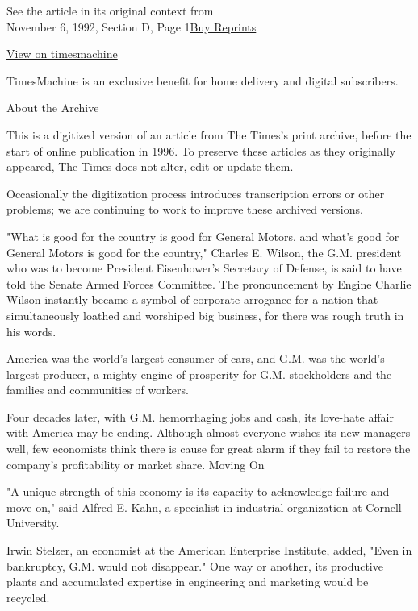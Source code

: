 See the article in its original context from\\
November 6, 1992, Section D, Page
1\href{https://store.nytimes3xbfgragh.onion/collections/new-york-times-page-reprints?utm_source=nytimes\&utm_medium=article-page\&utm_campaign=reprints}{Buy
Reprints}

\href{http://timesmachine.nytimes3xbfgragh.onion/timesmachine/1992/11/06/243892.html}{View
on timesmachine}

TimesMachine is an exclusive benefit for home delivery and digital
subscribers.

About the Archive

This is a digitized version of an article from The Times's print
archive, before the start of online publication in 1996. To preserve
these articles as they originally appeared, The Times does not alter,
edit or update them.

Occasionally the digitization process introduces transcription errors or
other problems; we are continuing to work to improve these archived
versions.

"What is good for the country is good for General Motors, and what's
good for General Motors is good for the country," Charles E. Wilson, the
G.M. president who was to become President Eisenhower's Secretary of
Defense, is said to have told the Senate Armed Forces Committee. The
pronouncement by Engine Charlie Wilson instantly became a symbol of
corporate arrogance for a nation that simultaneously loathed and
worshiped big business, for there was rough truth in his words.

America was the world's largest consumer of cars, and G.M. was the
world's largest producer, a mighty engine of prosperity for G.M.
stockholders and the families and communities of workers.

Four decades later, with G.M. hemorrhaging jobs and cash, its love-hate
affair with America may be ending. Although almost everyone wishes its
new managers well, few economists think there is cause for great alarm
if they fail to restore the company's profitability or market share.
Moving On

"A unique strength of this economy is its capacity to acknowledge
failure and move on," said Alfred E. Kahn, a specialist in industrial
organization at Cornell University.

Irwin Stelzer, an economist at the American Enterprise Institute, added,
"Even in bankruptcy, G.M. would not disappear." One way or another, its
productive plants and accumulated expertise in engineering and marketing
would be recycled.

